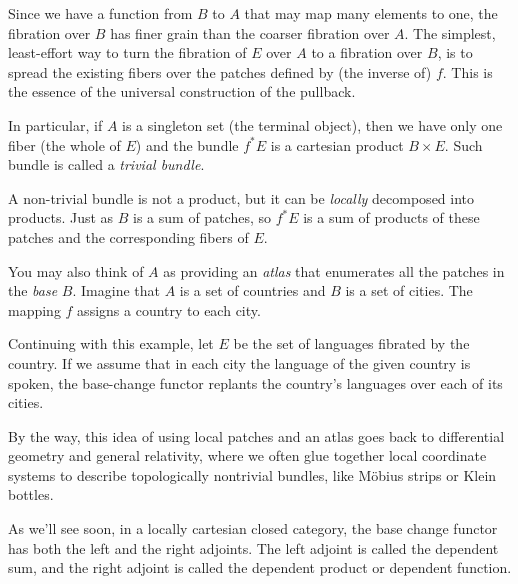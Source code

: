 \documentclass[DaoFP]{subfiles}
\begin{document}
Since we have a function from $B$ to $A$ that may map many elements to one, the fibration over $B$ has finer grain than the coarser fibration over $A$. The simplest, least-effort way to turn the fibration of $E$ over $A$ to a fibration over $B$, is to spread the existing fibers over the patches defined by (the inverse of) $f$. This is the essence of the universal construction of the pullback.

In particular, if $A$ is a singleton set (the terminal object), then we have only one fiber (the whole of $E$) and the bundle $f^*E$ is a cartesian product $B \times E$. Such bundle is called a \emph{trivial bundle}.

A non-trivial bundle is not a product, but it can be \emph{locally} decomposed into products. Just as $B$ is a sum of patches, so $f^*E$ is a sum of products of these patches and the corresponding fibers of $E$.



You may also think of $A$ as providing an \emph{atlas} that enumerates all the patches in the \emph{base} $B$. Imagine that $A$ is a set of countries and $B$ is a set of cities. The mapping $f$ assigns a country to each city.

Continuing with this example, let $E$ be the set of languages fibrated by the country. If we assume that in each city the language of the given country is spoken, the base-change functor replants the country's languages over each of its cities.

By the way, this idea of using local patches and an atlas goes back to differential geometry and general relativity, where we often glue together local coordinate systems to describe topologically nontrivial bundles, like M\"{o}bius strips or Klein bottles.

As we'll see soon, in a locally cartesian closed category, the base change functor has both the left and the right adjoints. The left adjoint is called the dependent sum, and the right adjoint is called the dependent product or dependent function. 
\end{document}
